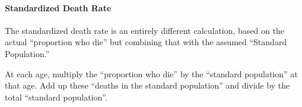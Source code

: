 \documentclass{article}
\begin{document}
\bigskip
\paragraph{Standardized Death Rate}


The standardized death rate is an entirely different calculation,
based on the actual ``proportion who die'' but combining that with the
assumed ``Standard Population.''

At each age, multiply the ``proportion who die'' by the ``standard
population'' at that age.  Add up these ``deaths in the standard population'' and divide by the total
``standard population''.
\end{document}
